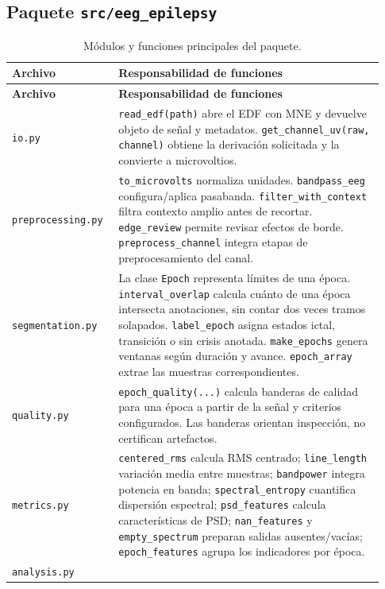 \documentclass[11pt,a4paper]{article}
\begin{document}
\subsection{Paquete \texttt{src/eeg\_epilepsy}}
\begin{longtable}{p{0.25\linewidth}p{0.68\linewidth}}
\caption{Módulos y funciones principales del paquete.}\\
\toprule \textbf{Archivo} & \textbf{Responsabilidad de funciones}\\ \midrule
\endfirsthead
\toprule \textbf{Archivo} & \textbf{Responsabilidad de funciones}\\ \midrule
\endhead
\texttt{io.py} &
\texttt{read\_edf(path)} abre el EDF con MNE y devuelve objeto de señal y metadatos. \texttt{get\_channel\_uv(raw, channel)} obtiene la derivación solicitada y la convierte a microvoltios.\\
\texttt{preprocessing.py} &
\texttt{to\_microvolts} normaliza unidades. \texttt{bandpass\_eeg} configura/aplica pasabanda. \texttt{filter\_with\_context} filtra contexto amplio antes de recortar. \texttt{edge\_review} permite revisar efectos de borde. \texttt{preprocess\_channel} integra etapas de preprocesamiento del canal.\\
\texttt{segmentation.py} &
La clase \texttt{Epoch} representa límites de una época. \texttt{interval\_overlap} calcula cuánto de una época intersecta anotaciones, sin contar dos veces tramos solapados. \texttt{label\_epoch} asigna estados ictal, transición o sin crisis anotada. \texttt{make\_epochs} genera ventanas según duración y avance. \texttt{epoch\_array} extrae las muestras correspondientes.\\
\texttt{quality.py} &
\texttt{epoch\_quality(...)} calcula banderas de calidad para una época a partir de la señal y criterios configurados. Las banderas orientan inspección, no certifican artefactos.\\
\texttt{metrics.py} &
\texttt{centered\_rms} calcula RMS centrado; \texttt{line\_length} variación media entre muestras; \texttt{bandpower} integra potencia en banda; \texttt{spectral\_entropy} cuantifica dispersión espectral; \texttt{psd\_features} calcula características de PSD; \texttt{nan\_features} y \texttt{empty\_spectrum} preparan salidas ausentes/vacías; \texttt{epoch\_features} agrupa los indicadores por época.\\
\texttt{analysis.py} &

\end{longtable}
\end{document}
